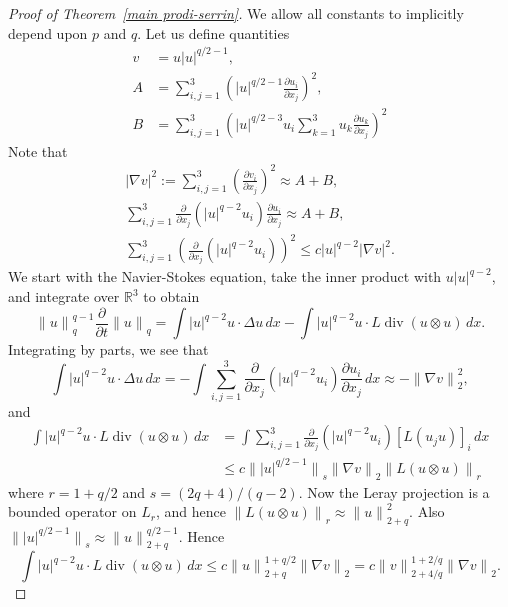 \documentclass[12pt]{amsart}
\theoremstyle{remark}
\newcommand{\R}{{\mathbb R}}
\newcommand{\smodo}[1]{{\mathopen|#1\mathclose|}}
\newcommand{\snormo}[1]{{\mathopen\|#1\mathclose\|}}
\DeclareMathOperator{\divergence}{div}
\begin{document}
\begin{proof}[Proof of Theorem~\ref{main prodi-serrin}]
We allow all constants to implicitly
depend upon $p$ and $q$.
Let us define quantities
\begin{align*}
v &= u \smodo u^{q/2-1} ,\\
A &= \sum_{i,j=1}^3 \left(\smodo u^{q/2-1} 
     \frac{\partial u_i}{\partial x_j} \right)^2 ,\\
B &= \sum_{i,j=1}^3 \left(\smodo u^{q/2-3} u_i \sum_{k=1}^3 u_k 
     \frac{\partial u_k}{\partial x_j}\right)^2
\end{align*}
Note that
\begin{gather*}
   \smodo{\nabla v}^2 := \sum_{i,j=1}^3 \left(
   \frac{\partial v_i}{\partial x_j}\right)^2
   \approx A + B,\\
   \sum_{i,j=1}^3 \frac\partial{\partial x_j}\left( \smodo u^{q-2} u_i \right)
   \frac{\partial u_i}{\partial x_j}
   \approx A + B,\\
   \sum_{i,j=1}^3 \left(\frac\partial{\partial x_j} 
   \left(\smodo u^{q-2} u_i\right)\right)^2
   \le
   c \smodo u^{q-2} \smodo{\nabla v}^2 .
\end{gather*}
We start with the Navier-Stokes equation, take the inner product with 
$u \smodo{u}^{q-2}$, and integrate over $\R^3$ to obtain
$$
    \snormo u_q^{q-1} \frac{\partial}{\partial t} \snormo u_q
    =
    \int \smodo u^{q-2} u \cdot \Delta u \, dx
    -
    \int \smodo u^{q-2} u \cdot L \divergence (u \otimes u) \, dx .
$$
Integrating by parts, we see that
$$ \int \smodo u^{q-2} u \cdot \Delta u \, dx
   =
   - \int 
   \sum_{i,j=1}^3 \frac\partial{\partial x_j}\left( \smodo u^{q-2} u_i \right)
   \frac{\partial u_i}{\partial x_j}
   \, dx
   \approx
   - \snormo{\nabla v}_2^2 ,$$
and
\begin{align*} 
   \int \smodo u^{q-2} u \cdot L \divergence (u \otimes u) \, dx
   &=
   \int \sum_{i,j=1}^3
        \frac\partial{\partial x_j} \left(\smodo u^{q-2} u_i\right)
        [L (u_j u)]_i \, dx \\
   &\le
   c \snormo{\smodo{u}^{q/2-1}}_s \snormo{\nabla v}_2 \snormo{L(u \otimes u)}_r
\end{align*}
where $r = 1+q/2$ and $s = (2q+4)/(q-2)$.  Now the Leray projection is a bounded
operator on $L_r$, and hence 
$\snormo{L(u \otimes u)}_r \approx \snormo u_{2+q}^2$.  Also
$\snormo{\smodo{u}^{q/2-1}}_s \approx \snormo u_{2+q}^{q/2-1}$.  Hence
$$ \int \smodo u^{q-2} u \cdot L \divergence (u \otimes u) \, dx
   \le c \snormo u_{2+q}^{1+q/2} \snormo{\nabla v}_2 
   = c \snormo v_{2+4/q}^{1+2/q} \snormo{\nabla v}_2 .$$

\end{proof}
\end{document}
